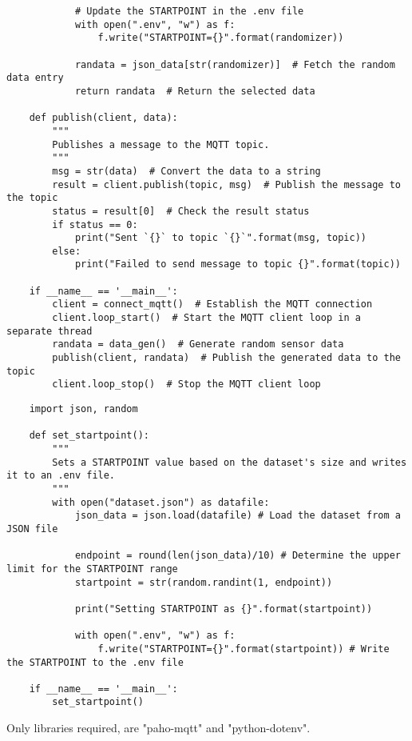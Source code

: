 \begin{verbatim}
            # Update the STARTPOINT in the .env file
            with open(".env", "w") as f:
                f.write("STARTPOINT={}".format(randomizer))

            randata = json_data[str(randomizer)]  # Fetch the random data entry
            return randata  # Return the selected data

    def publish(client, data):
        """
        Publishes a message to the MQTT topic.
        """
        msg = str(data)  # Convert the data to a string
        result = client.publish(topic, msg)  # Publish the message to the topic
        status = result[0]  # Check the result status
        if status == 0:
            print("Sent `{}` to topic `{}`".format(msg, topic))
        else:
            print("Failed to send message to topic {}".format(topic))        

    if __name__ == '__main__':
        client = connect_mqtt()  # Establish the MQTT connection
        client.loop_start()  # Start the MQTT client loop in a separate thread
        randata = data_gen()  # Generate random sensor data
        publish(client, randata)  # Publish the generated data to the topic
        client.loop_stop()  # Stop the MQTT client loop
\end{verbatim}

\begin{verbatim}
    import json, random

    def set_startpoint():
        """
        Sets a STARTPOINT value based on the dataset's size and writes it to an .env file.
        """
        with open("dataset.json") as datafile:
            json_data = json.load(datafile) # Load the dataset from a JSON file
            
            endpoint = round(len(json_data)/10) # Determine the upper limit for the STARTPOINT range
            startpoint = str(random.randint(1, endpoint))

            print("Setting STARTPOINT as {}".format(startpoint))

            with open(".env", "w") as f:
                f.write("STARTPOINT={}".format(startpoint)) # Write the STARTPOINT to the .env file

    if __name__ == '__main__':
        set_startpoint()
\end{verbatim}

Only libraries required, are "paho-mqtt" and "python-dotenv".

